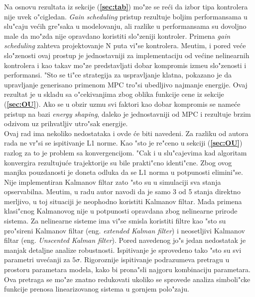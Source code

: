 \documentclass[a4paper,11pt]{article}
\theoremstyle{definition} \newtheorem{deff}{Definicija}[section]
\theoremstyle{definition} \newtheorem{prim}[deff]{Primer}
\theoremstyle{plain} \newtheorem{teor}[deff]{Teorema}
\begin{document}
	Na osnovu rezultata iz sekcije (\textbf{\ref{sec:tab}}) mo"ze se re\'ci da  izbor tipa kontrolera nije uvek o"cigledan. \emph{Gain scheduling} pristup rezultuje boljim performansama u slu"caju ve\'cih gre"saka u modelovanju, ali razlike u performansama su dovoljno male da mo"zda nije opravdano koristiti slo"zeniji kontroler. Primena 
	\emph{gain scheduling} zahteva projektovanje N puta vi"se kontrolera. Me\dj utim, i pored ve\'ce slo"zenosti ovaj prostup je jednostavniji za implementaciju od ve\'cine nelinearnih kontrolera i kao takav mo"ze predstavljati dobar kompromis izme\dj u slo"zenosti i performansi. "Sto se ti"ce strategija za uspravljanje klatna, pokazano je da upravljanje generisano primenom MPC tro"si ubedljivo najmanje energije. Ovaj rezultat je u skladu sa o"cekivanjima zbog oblika funkcije cene iz sekcije (\textbf{\ref{sec:OU}}). Ako se u obzir uzmu svi faktori kao dobar kompromis se name\'ce pristup na bazi \emph{energy shaping}, daleko je jednostavniji od MPC i rezultuje brzim odzivom uz prihvatljiv utro"sak energije.  \\
	
	Ovaj rad ima nekoliko nedostataka i ovde \'ce biti navedeni. Za razliku od autora rada \cite{inicijalna} ne vr"si se ispitivanje L1 norme. Kao "sto je re"ceno u sekciji (\textbf{\ref{sec:OU}}) razlog za to je problem sa konvergencijom. "Cak i u slu"cajevima kad algoritam konvergira rezultuju\'ce trajektorije su bile prakti"cno identi"cne. Zbog ovog manjka pouzdanosti je doneta odluka da se L1 norma u potpunosti elimini"se. Nije implementiran Kalmanov filtar zato "sto su u simulaciji sva stanja opservabilna. Me\dj utim, u radu autor navodi da je samo 3 od 5 stanja direktno merljivo, u toj situaciji je neophodno koristiti Kalmanov filtar. Mada primena klasi"cnog Kalmanovog nije u potpunosti opravdana zbog nelinearne prirode sistema. Za nelinearne sisteme ima vi"se smisla koristiti filtre kao "sto su pro"sireni Kalmanov filtar (eng. \emph{extended Kalman filter}) i neosetljivi Kalmanov filtar (eng. \emph{Unscented Kalman filter}). Pored navedenog jo"s jedan nedostatak je manjak detaljne analize robustnosti. Ispitivanje je sprovedeno tako "sto su svi parametri uve\'canji za $5\sigma$. Rigoroznije ispitivanje podrazumeva pretragu u prostoru parametara modela, kako bi prona"sli najgoru kombinaciju parametara. Ova pretraga se mo"ze znatno redukovati ukoliko se sprovede analiza simboli"cke funkcije prenosa linearizovanog sistema u gornjem polo"zaju. \\
	
\end{document}
